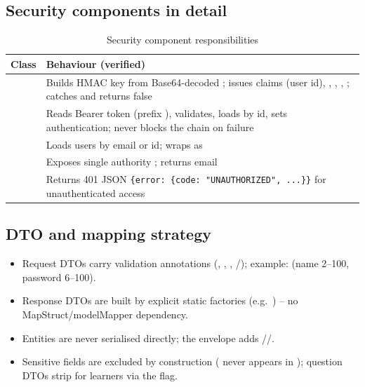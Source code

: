 \subsection{Security components in detail}
\begin{table}[H]
\centering
\caption{Security component responsibilities}
\label{tab:security-components}
\begin{tabular}{@{}L{3.8cm}L{9.4cm}@{}}
\toprule
\textbf{Class} & \textbf{Behaviour (verified)} \\
\midrule
{} & Builds HMAC key from Base64-decoded ; issues claims  (user id), , , , ;  catches  and returns false \\
 & Reads Bearer token (prefix ), validates, loads  by id, sets authentication; never blocks the chain on failure \\
 & Loads users by email or id; wraps as  \\
 & Exposes single authority ;  returns email \\
 & Returns 401 JSON \texttt{\{error: \{code: "UNAUTHORIZED", ...\}\}} for unauthenticated access \\
\bottomrule
\end{tabular}
\end{table}

\subsection{DTO and mapping strategy}

\begin{itemize}
    \item Request DTOs carry validation annotations (, , , /); example:  (name 2--100, password 6--100).
    \item Response DTOs are built by explicit static factories (e.g.\ ) -- no MapStruct/modelMapper dependency.
    \item Entities are never serialised directly; the envelope adds //.
    \item Sensitive fields are excluded by construction ( never appears in ); question DTOs strip  for learners via the  flag.
\end{itemize}

